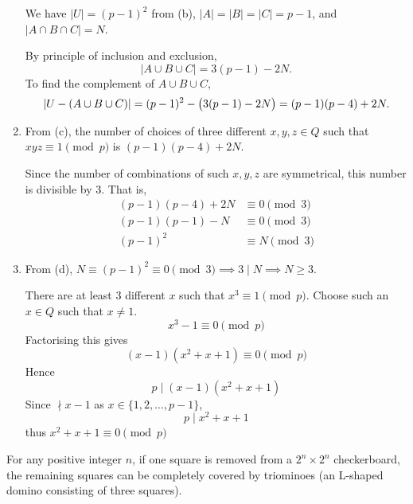 \begin{solution}
\begin{enumerate}[label=(\alph*)]
We have $|U|=(p-1)^2$ from (b), $|A|=|B|=|C|=p-1$, and $|A\cap B\cap C|=N$.

By principle of inclusion and exclusion,
\[ |A\cup B\cup C|=3(p-1)-2N. \]
To find the complement of $A\cup B\cup C$, 
\[ |U-(A\cup B\cup C)|=(p-1)^2-\left(3(p-1)-2N\right)=(p-1)(p-4)+2N. \]

\item From (c), the number of choices of three different $x,y,z\in Q$ such that $xyz\equiv1\pmod p$ is $(p-1)(p-4)+2N$.

Since the number of combinations of such $x,y,z$ are symmetrical, this number is divisible by $3$. That is,
\begin{align*}
(p-1)(p-4)+2N &\equiv 0 \pmod 3 \\
(p-1)(p-1)-N &\equiv 0 \pmod 3 \\
(p-1)^2 &\equiv N \pmod 3
\end{align*}

\item From (d), $N\equiv(p-1)^2\equiv0\pmod 3 \implies 3\mid N \implies N\ge3$.

There are at least $3$ different $x$ such that $x^3\equiv1\pmod p$. Choose such an $x\in Q$ such that $x\neq1$.
\[ x^3-1 \equiv 0\pmod p \]
Factorising this gives
\[ (x-1)(x^2+x+1) \equiv 0\pmod p \]
Hence
\[ p\mid(x-1)(x^2+x+1) \]
Since $\nmid x-1$ as $x\in\{1,2,\dots,p-1\}$,
\[ p\mid x^2+x+1 \]
thus $x^2+x+1\equiv0\pmod p$
\end{enumerate}
\end{solution}
\pagebreak

\begin{prbm}
For any positive integer $n$, if one square is removed from a $2^n\times2^n$ checkerboard, the remaining squares can be completely covered by triominoes (an L-shaped domino consisting of three squares).
\end{prbm}

